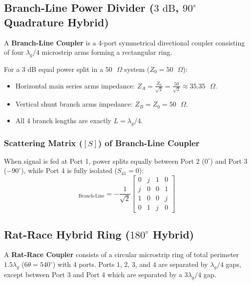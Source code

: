 \documentclass[10pt,a4paper]{article}
\begin{document}
\subsection{Branch-Line Power Divider ($3\text{ dB}$, $90^\circ$ Quadrature Hybrid)}
A \textbf{Branch-Line Coupler} is a 4-port symmetrical directional coupler consisting of four $\lambda_g/4$ microstrip arms forming a rectangular ring.

\begin{tcolorbox}[masonbox, title={Branch-Line Coupler Design Parameters}]
  For a $3\text{ dB}$ equal power split in a $50\text{ }\Omega$ system ($Z_0 = 50\text{ }\Omega$):
  \begin{itemize}[leftmargin=*, noitemsep]
    \item Horizontal main series arms impedance: $Z_A = \frac{Z_0}{\sqrt{2}} = \frac{50}{\sqrt{2}} \approx 35.35\text{ }\Omega$.
    \item Vertical shunt branch arms impedance: $Z_B = Z_0 = 50\text{ }\Omega$.
    \item All 4 branch lengths are exactly $L = \lambda_g/4$.
  \end{itemize}
\end{tcolorbox}

\subsubsection{Scattering Matrix ($[S]$) of Branch-Line Coupler}
When signal is fed at Port 1, power splits equally between Port 2 ($0^\circ$) and Port 3 ($-90^\circ$), while Port 4 is fully isolated ($S_{41} = 0$):
\begin{equation}
  [S]_{\text{Branch-Line}} = -\frac{1}{\sqrt{2}} \begin{bmatrix} 0 & j & 1 & 0 \\ j & 0 & 0 & 1 \\ 1 & 0 & 0 & j \\ 0 & 1 & j & 0 \end{bmatrix}
\end{equation}

\subsection{Rat-Race Hybrid Ring ($180^\circ$ Hybrid)}
A \textbf{Rat-Race Coupler} consists of a circular microstrip ring of total perimeter $1.5\lambda_g$ ($6\theta = 540^\circ$) with 4 ports. Ports 1, 2, 3, and 4 are separated by $\lambda_g/4$ gaps, except between Port 3 and Port 4 which are separated by a $3\lambda_g/4$ gap.
\end{document}
